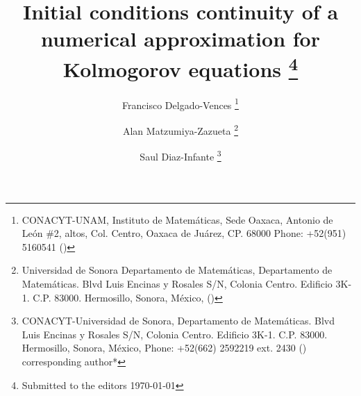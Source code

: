 \title{%
        Initial conditions continuity of a numerical 
        approximation for Kolmogorov equations
    \thanks{Submitted to the editors \today}
}
%
\author{
    Francisco Delgado-Vences
    \footnotemark[1]
    \thanks{
    CONACYT-UNAM, 
    Instituto de Matem\'aticas, 
    Sede Oaxaca,
    Antonio de Le\'on \#2, altos, Col. Centro,
    Oaxaca de Ju\'arez, CP. 68000
    Phone: +52(951) 5160541
    ()
    }
%
    \and %
    Alan Matzumiya-Zazueta
   \footnotemark[2]
    \thanks{
    Universidad de Sonora
    Departamento de Matem\'aticas,
    Departamento de Matem\'aticas. 
    Blvd Luis Encinas y Rosales S/N, 
    Colonia Centro. 
    Edificio 3K-1. C.P. 83000.
    Hermosillo, Sonora, M\'exico,
    ()
    }
%
    \and %
    Saul Diaz-Infante
   \footnotemark[3]
    \thanks{%
    CONACYT-Universidad de Sonora, 
    Departamento de Matem\'aticas. 
    Blvd Luis Encinas y Rosales S/N, 
    Colonia Centro. 
    Edificio 3K-1. C.P. 83000.
    Hermosillo, Sonora, M\'exico,
    Phone: +52(662) 2592219 ext. 2430
    ()
    corresponding author*
    }
}
%
\DeclareMathOperator{\sech}{sech}
\ifpdf
\else
\fi